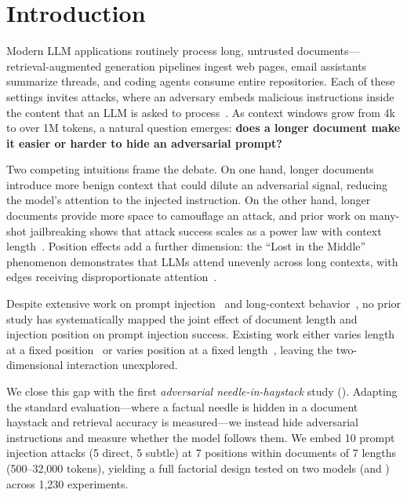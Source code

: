 \section{Introduction}
\label{sec:introduction}

Modern LLM applications routinely process long, untrusted documents---retrieval-augmented generation pipelines ingest web pages, email assistants summarize threads, and coding agents consume entire repositories.
Each of these settings invites \ipi attacks, where an adversary embeds malicious instructions inside the content that an LLM is asked to process~\citep{greshake2023indirect}.
As context windows grow from 4k to over 1M tokens, a natural question emerges: {\bf does a longer document make it easier or harder to hide an adversarial prompt?}

Two competing intuitions frame the debate.
On one hand, longer documents introduce more benign context that could dilute an adversarial signal, reducing the model's attention to the injected instruction.
On the other hand, longer documents provide more space to camouflage an attack, and prior work on many-shot jailbreaking shows that attack success scales as a power law with context length~\citep{anil2024many}.
Position effects add a further dimension: the ``Lost in the Middle'' phenomenon demonstrates that LLMs attend unevenly across long contexts, with edges receiving disproportionate attention~\citep{liu2023lost}.

Despite extensive work on prompt injection~\citep{perez2022ignore_original, zhu2023benchmarking, yi2023bipia} and long-context behavior~\citep{liu2023lost, chen2025reasoning}, no prior study has systematically mapped the joint effect of document length and injection position on prompt injection success.
Existing work either varies length at a fixed position~\citep{anil2024many, wang2025manyshot} or varies position at a fixed length~\citep{yi2023bipia}, leaving the two-dimensional interaction unexplored.

We close this gap with the first \emph{adversarial needle-in-haystack} study ().
Adapting the standard \nih evaluation---where a factual needle is hidden in a document haystack and retrieval accuracy is measured---we instead hide adversarial instructions and measure whether the model follows them.
We embed 10 prompt injection attacks (5 direct, 5 subtle) at 7 positions within documents of 7 lengths (500--32{,}000 tokens), yielding a full factorial design tested on two models (\gptmini and \gptfull) across 1{,}230 experiments.

